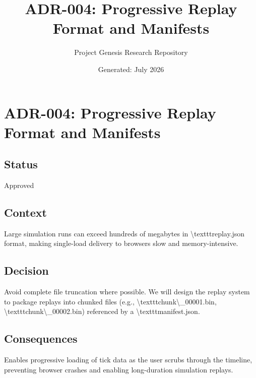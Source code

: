 \documentclass[11pt,a4paper]{article}
\title{\textbf{ADR-004: Progressive Replay Format and Manifests}}
\author{Project Genesis Research Repository}
\date{\small Generated: July 2026}
\begin{document}
\maketitle
\thispagestyle{empty}

\newpage
\section*{ADR-004: Progressive Replay Format and Manifests}

\subsection*{Status}
Approved

\subsection*{Context}
Large simulation runs can exceed hundreds of megabytes in \textbackslash{}texttt{replay.json} format, making single-load delivery to browsers slow and memory-intensive.

\subsection*{Decision}
Avoid complete file truncation where possible. We will design the replay system to package replays into chunked files (e.g., \textbackslash{}texttt{chunk\textbackslash{}\_00001.bin}, \textbackslash{}texttt{chunk\textbackslash{}\_00002.bin}) referenced by a \textbackslash{}texttt{manifest.json}.

\subsection*{Consequences}
Enables progressive loading of tick data as the user scrubs through the timeline, preventing browser crashes and enabling long-duration simulation replays.
\end{document}
